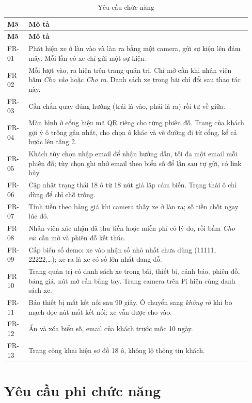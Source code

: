 \begin{longtable}{@{}P{1.3cm}P{12.8cm}@{}}
\caption{Yêu cầu chức năng}\label{tab:fr}\\
\toprule
\textbf{Mã} & \textbf{Mô tả} \\ \midrule
\endfirsthead
\toprule
\textbf{Mã} & \textbf{Mô tả} \\ \midrule
\endhead
FR-01 & Phát hiện xe ở làn vào và làn ra bằng một camera, gửi sự kiện lên đám mây. Mỗi lần có xe chỉ gửi một sự kiện. \\
FR-02 & Mỗi lượt vào, ra hiện trên trang quản trị. Chỉ mở cần khi nhân viên bấm \emph{Cho vào} hoặc \emph{Cho ra}. Danh sách xe trong bãi chỉ đổi sau thao tác này. \\
FR-03 & Cần chắn quay đúng hướng (trái là vào, phải là ra) rồi tự về giữa. \\
FR-04 & Màn hình ở cổng hiện mã QR riêng cho từng phiên đỗ. Trang của khách gợi ý ô trống gần nhất, cho chọn ô khác và vẽ đường đi từ cổng, kể cả bước lên tầng 2. \\
FR-05 & Khách tùy chọn nhập email để nhận hướng dẫn, tối đa một email mỗi phiên đỗ; tùy chọn ghi nhớ email theo biển số để lần sau tự gửi, có link hủy. \\
FR-06 & Cập nhật trạng thái 18 ô từ 18 nút giả lập cảm biến. Trạng thái ô chỉ dùng để chỉ chỗ trống. \\
FR-07 & Tính tiền theo bảng giá khi camera thấy xe ở làn ra; số tiền chốt ngay lúc đó. \\
FR-08 & Nhân viên xác nhận đã thu tiền hoặc miễn phí có lý do, rồi bấm \emph{Cho ra}: cần mở và phiên đỗ kết thúc. \\
FR-09 & Cấp biển số demo: xe vào nhận số nhỏ nhất chưa dùng (11111, 22222,\ldots); xe ra là xe có số lớn nhất đang đỗ. \\
FR-10 & Trang quản trị có danh sách xe trong bãi, thiết bị, cảnh báo, phiên đỗ, bảng giá, nút mở cần bằng tay. Trang camera trên Pi hiện cùng danh sách xe. \\
FR-11 & Báo thiết bị mất kết nối sau 90 giây. Ô chuyển sang \emph{không rõ} khi bo mạch đọc nút mất kết nối; xe vẫn được cho vào. \\
FR-12 & Ẩn và xóa biển số, email của khách trước mốc 10 ngày. \\
FR-13 & Trang công khai hiện sơ đồ 18 ô, không lộ thông tin khách. \\
\bottomrule
\end{longtable}

\section{Yêu cầu phi chức năng}

